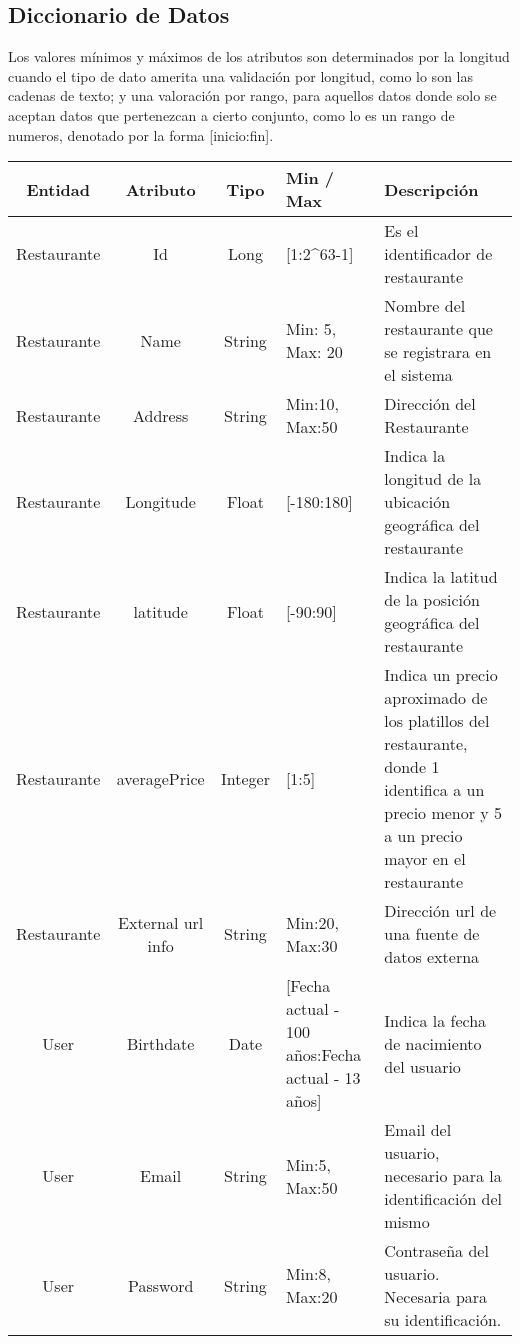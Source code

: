 \begin{landscape}
\section{Diccionario de Datos}
  Los valores mínimos y máximos de los atributos son determinados por la longitud cuando el tipo de dato amerita una validación por longitud, como lo son las cadenas de texto; y una valoración por rango, para aquellos datos donde solo se aceptan datos que pertenezcan a cierto conjunto, como lo es un rango de numeros, denotado por la forma [inicio:fin].
  \begin{table}[h]
    \begin{center}
      \begin{tabular}{| c | c | c | p{3cm} | p{12cm}|} 
        \toprule
        Entidad & Atributo & Tipo & Min / Max & Descripción\\
        \midrule
        Restaurante & Id  & Long & [1:2\^{ }63-1] & Es el identificador de restaurante \\
        \midrule
        Restaurante & Name  & String & Min: 5, Max: 20  & Nombre del restaurante que se registrara en el sistema \\
        \midrule
        Restaurante & Address  & String & Min:10, Max:50  & Dirección del Restaurante \\
        \midrule
        Restaurante & Longitude  & Float & [-180:180]  & Indica la longitud de la ubicación geográfica del restaurante \\
        \midrule
        Restaurante & latitude  & Float & [-90:90]  & Indica la latitud de la posición geográfica del restaurante\\
        \midrule
        Restaurante & averagePrice  & Integer & [1:5]  & Indica un precio aproximado de los platillos del restaurante, donde 1 identifica a un precio menor y 5 a un precio mayor en el restaurante\\
        \midrule
        Restaurante & External url info  & String & Min:20, Max:30  & Dirección url de una fuente de datos       		    externa \\
        \midrule
        User & Birthdate  & Date & [Fecha actual - 100 años:Fecha actual - 13 años]  & Indica la fecha de nacimiento del usuario\\
        \midrule
        User & Email  & String & Min:5, Max:50 & Email del usuario, necesario para la identificación del mismo\\
        \midrule
        User & Password  & String & Min:8, Max:20  & Contraseña del usuario. Necesaria para su identificación.\\

\end{tabular}
\end{center}
\end{table}
\end{landscape}
